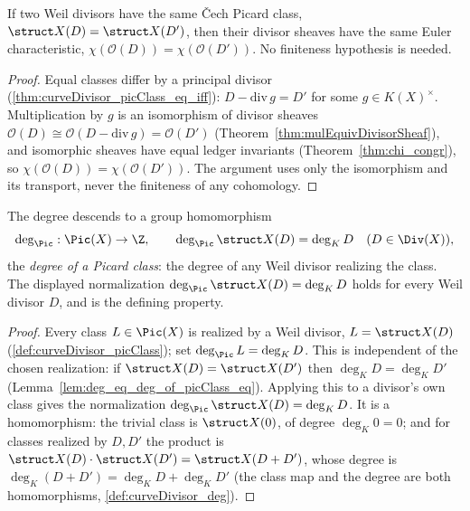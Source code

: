 \begin{theorem}
  \label{thm:chi_divisorSheaf_eq_of_picClass_eq}
  \leanok
  If two Weil divisors have the same \v Cech Picard class, \(\struct X(D) = \struct X(D')\), then
  their divisor sheaves have the same Euler characteristic, \(\chi(\mathcal O(D)) = \chi(\mathcal
  O(D'))\). No finiteness hypothesis is needed.
\end{theorem}
\begin{proof}
  \leanok
  Equal classes differ by a principal divisor (\ref{thm:curveDivisor_picClass_eq_iff}): \(D -
  \mathrm{div}\, g = D'\) for some \(g \in K(X)^\times\). Multiplication by \(g\) is an isomorphism
  of divisor sheaves \(\mathcal O(D) \cong \mathcal O(D - \mathrm{div}\, g) = \mathcal O(D')\)
  (Theorem~\ref{thm:mulEquivDivisorSheaf}), and isomorphic sheaves have equal ledger invariants
  (Theorem~\ref{thm:chi_congr}), so \(\chi(\mathcal O(D)) = \chi(\mathcal O(D'))\). The argument
  uses only the isomorphism and its transport, never the finiteness of any cohomology.
\end{proof}

\begin{definition}
  \label{def:classDeg}
  \leanok
  The degree descends to a group homomorphism
  \[
    \deg_{\Pic} : \Pic(X) \to \Z, \qquad \deg_{\Pic}\struct X(D) = \deg_K D
    \quad (D \in \Div(X)),
  \]
  the \emph{degree of a Picard class}: the degree of any Weil divisor realizing the class. The
  displayed normalization \(\deg_{\Pic}\struct X(D) = \deg_K D\) holds for every Weil divisor
  \(D\), and is the defining property.
\end{definition}
\begin{proof}
  \leanok
  Every class \(L \in \Pic(X)\) is realized by a Weil divisor, \(L = \struct X(D)\)
  (\ref{def:curveDivisor_picClass}); set \(\deg_{\Pic} L = \deg_K D\). This is independent of the
  chosen realization: if \(\struct X(D) = \struct X(D')\) then \(\deg_K D = \deg_K D'\)
  (Lemma~\ref{lem:deg_eq_deg_of_picClass_eq}). Applying this to a divisor's own class gives the
  normalization \(\deg_{\Pic}\struct X(D) = \deg_K D\). It is a homomorphism: the trivial class is
  \(\struct X(0)\), of degree \(\deg_K 0 = 0\); and for classes realized by \(D, D'\) the product
  is \(\struct X(D)\cdot\struct X(D') = \struct X(D + D')\), whose degree is \(\deg_K(D + D') =
  \deg_K D + \deg_K D'\) (the class map and the degree are both homomorphisms,
  \ref{def:curveDivisor_deg}).
\end{proof}


